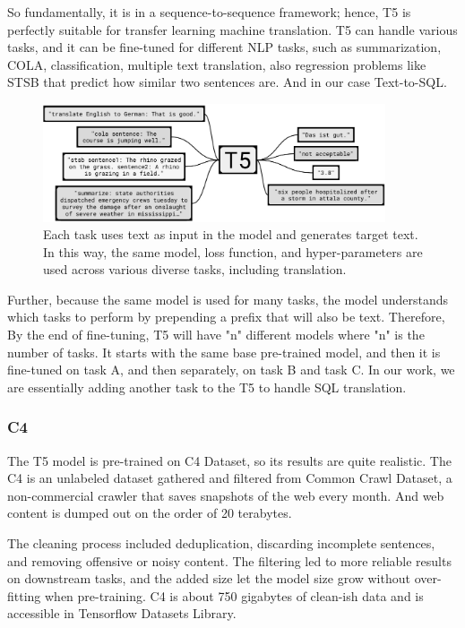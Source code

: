 So fundamentally, it is in a sequence-to-sequence framework; hence, T5 is perfectly suitable for transfer learning machine translation.
T5 can handle various tasks, and it can be fine-tuned for different NLP tasks, such as summarization, \ac{COLA}, classification, multiple text translation, also regression problems like STSB  that predict how similar two sentences are. And in our case Text-to-SQL.

\begin{figure}[H]
    \centering
    \includegraphics[width=0.9\textwidth]{pics/picard/t5-task.png}
    \caption{Each task uses text as input in the model and generates target text. In this way, the same model, loss function, and hyper-parameters are used across various diverse tasks, including translation. \cite{raffel_exploring_2020}}
\end{figure}

Further, because the same model is used for many tasks, the model understands which tasks to perform by prepending a prefix that will also be text.
Therefore, By the end of fine-tuning, T5 will have "n" different models where "n" is the number of tasks. It starts with the same base pre-trained model, and then it is fine-tuned on task A, and then separately, on task B and task C. In our work, we are essentially adding another task to the T5 to handle SQL translation.

\subsubsection*{\ac{C4}}

The T5 model is pre-trained on C4 Dataset\cite{raffel_exploring_2020}, so its results are quite realistic.
The C4 is an unlabeled dataset gathered and filtered from Common Crawl Dataset, a non-commercial crawler that saves snapshots of the web every month. And web content is dumped out on the order of 20 terabytes.

The cleaning process included deduplication, discarding incomplete sentences, and removing offensive or noisy content. The filtering led to more reliable results on downstream tasks, and the added size let the model size grow without over-fitting when pre-training. C4 is about 750 gigabytes of clean-ish data and is accessible in Tensorflow Datasets Library.
